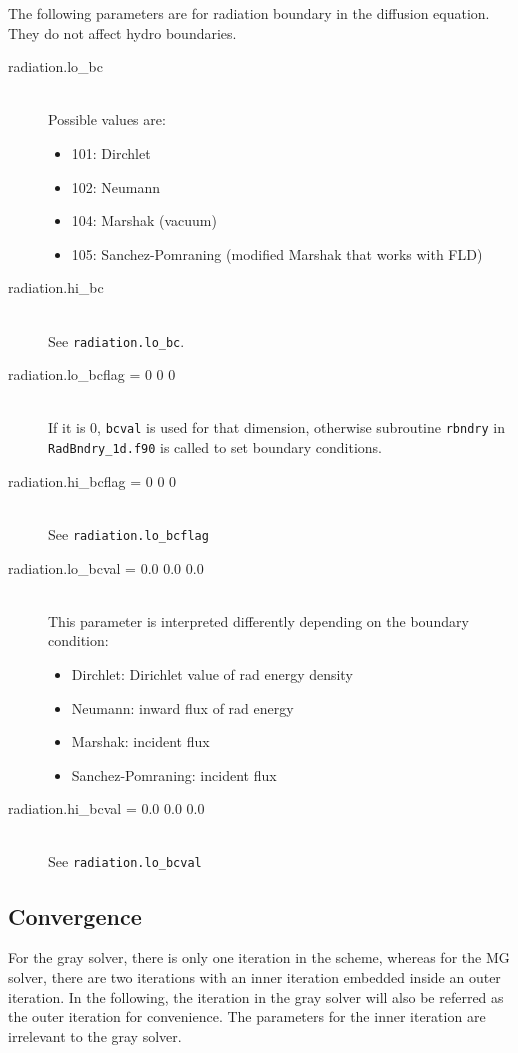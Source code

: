 \documentclass[11pt,letterpaper]{article}
\begin{document}
The following parameters are for radiation boundary in the diffusion
equation. They do not affect hydro boundaries. 
\begin{description}
\item[radiation.lo\_bc] \hfill \\
  Possible values are:
  \begin{itemize}
    \item 101: Dirchlet
    \item 102: Neumann
    \item 104: Marshak (vacuum) 
    \item 105: Sanchez-Pomraning (modified Marshak that works with FLD)
  \end{itemize}
\item[radiation.hi\_bc] \hfill \\
  See {\tt radiation.lo\_bc}.
\item[radiation.lo\_bcflag = 0 0 0] \hfill \\
  If it is 0, {\tt bcval} is used for that dimension, otherwise 
  subroutine {\tt rbndry} in {\tt RadBndry\_1d.f90} is called to set
  boundary conditions.
\item[radiation.hi\_bcflag = 0 0 0] \hfill \\
  See {\tt radiation.lo\_bcflag}
\item[radiation.lo\_bcval = 0.0 0.0 0.0] \hfill \\
  This parameter is interpreted differently depending on the boundary
  condition:
  \begin{itemize}
    \item Dirchlet: Dirichlet value of rad energy density
    \item Neumann:  inward flux of rad energy
    \item Marshak:  incident flux
    \item Sanchez-Pomraning: incident flux
  \end{itemize}
\item[radiation.hi\_bcval = 0.0 0.0 0.0] \hfill \\
  See {\tt radiation.lo\_bcval}
\end{description}

\subsection{Convergence}

For the gray solver, there is only one iteration in the scheme,
whereas for the MG solver, there are two iterations with an inner
iteration embedded inside an outer iteration.  In the following, the
iteration in the gray solver will also be referred as the outer
iteration for convenience.  The parameters for the inner iteration are
irrelevant to the gray solver.  
\end{document}
